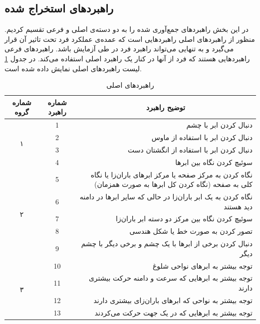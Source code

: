 \documentclass[twoside, a4paper,11pt]{book}
\numberwithin{equation}{chapter}
\numberwithin{table}{chapter}
\numberwithin{figure}{chapter}
\numberwithin{equation}{chapter}
\begin{document}
\subsection{راهبرد‌های استخراج شده}
در این بخش راهبرد‌های جمع‌آوری شده را  به دو دسته‌ی اصلی و فرعی تقسیم  کردیم. منظور از راهبردهای اصلی راهبرد‌هایی است که عمده‌ی عملکرد فرد تحت تاثیر آن قرار می‌گیرد و به تنهایی می‌تواند راهبرد فرد در طی آزمایش باشد. راهبردهای فرعی راهبردهایی هستند که فرد از آنها در کنار یک راهبرد اصلی استفاده می‌کند. در جدول \ref{StrategyList} لیست راهبرد‌های اصلی نمایش داده شده است.
\begin{table}[]
	\centering
	\caption{راهبرد‌های اصلی}
	\label{StrategyList}
	\begin{scriptsize}
	\begin{center}
	\renewcommand{\arraystretch}{2}
	\begin{tabular}{|c|c|r|}
		\hline
\textbf{شماره گروه} & \textbf{شماره راهبرد} & \multicolumn{1}{c|}{\textbf{توضیح راهبرد}} \\ \hline
		\multirow{4}{*}{۱} & 1 & دنبال کردن ابر با چشم \\ \cline{2-3} 
		& 2 & دنبال کردن ابر با استفاده از ماوس \\ \cline{2-3} 
		& 3 & دنبال کردن ابر با استفاده از انگشتان دست \\ \cline{2-3} 
		& 4 & سوئیچ کردن نگاه بین ابرها \\ \hline
		\multirow{5}{*}{۲} & 5 & نگاه کردن به مرکز صفحه یا مرکز ابرهای باران‌زا یا نگاه کلی به صفحه (نگاه کردن کل ابرها به صورت همزمان) \\ \cline{2-3} 
		& 6 & نگاه کردن به یک ابر باران‌زا در حالی که سایر ابرها در دامنه دید هستند \\ \cline{2-3} 
		& 7 & سوئیچ کردن نگاه بین مرکز دو دسته ابر باران‌زا \\ \cline{2-3} 
		& 8 & تصور کردن به صورت خط یا شکل هندسی \\ \cline{2-3} 
		& 9 & دنبال کردن برخی از ابرها با یک چشم و برخی دیگر با چشم دیگر \\ \hline
		\multirow{4}{*}{۳} & 10 & توجه بیشتر به ابرهای نواحی شلوغ \\ \cline{2-3} 
		& 11 & توجه بیشتر به ابرهایی که سرعت و دامنه حرکت بیشتری دارند \\ \cline{2-3} 
		& 12 & توجه بیشتر به نواحی که ابرهای باران‌زای بیشتری دارند \\ \cline{2-3} 
		& 13 & توجه بیشتر به ابرهایی که در یک جهت حرکت می‌کردند \\ \hline
	\end{tabular}
	\end{center}
	\end{scriptsize}
\end{table}
\end{document}
